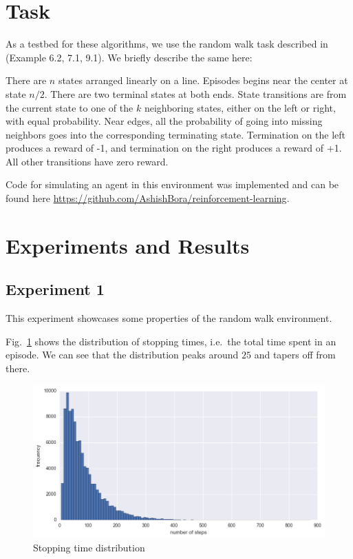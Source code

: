 \documentclass{article}
\begin{document}

\section{Task}

As a testbed for these algorithms, we use the random walk task described in~\cite{RLbook} (Example 6.2, 7.1, 9.1). We briefly describe the same here:

There are $n$ states arranged linearly on a line. Episodes begins near the center at state $n/2$. There are two terminal states at both ends. State transitions are from the current state to one of the $k$  neighboring states, either on the left or right, with equal probability. Near edges, all the probability of going into missing neighbors goes into the corresponding terminating state. Termination on the left produces a reward of -1, and termination on the right produces a reward of +1. All other transitions have zero reward.

Code for simulating an agent in this environment was implemented and can be found here \url{https://github.com/AshishBora/reinforcement-learning}.

\section{Experiments and Results}\label{expt}

\subsection{Experiment 1}
    This experiment showcases some properties of the random walk environment.

    Fig.~\ref{fig:stop_time} shows the distribution of stopping times, i.e.\ the total time spent in an episode. We can see that the distribution peaks around $25$ and tapers off from there.
    \begin{figure}
        \centering
        \includegraphics[width=\textwidth]{stopping_time}
        \caption{Stopping time distribution}\label{fig:stop_time}
    \end{figure}
\end{document}
